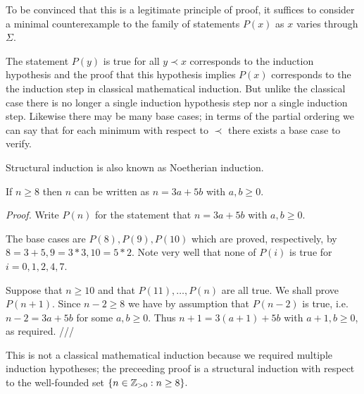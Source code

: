 \begin{ap} To be convinced that this is a legitimate principle of
    proof, it suffices to consider a minimal counterexample to the family of
    statements $P(x)$ as $x$ varies through $\Sigma$.
\end{ap}

\begin{ap} The statement $P(y)$ is true for all $y \prec x$
    corresponds to the induction hypothesis and the proof that this
    hypothesis implies $P(x)$ corresponds to the the induction step in
    classical mathematical induction. But unlike the classical case
    there is no longer a single induction hypothesis step nor a single
    induction step. Likewise there may be many base cases; in terms of
    the partial ordering we can say that for each minimum with respect
    to $\prec$ there exists a base case to verify.
\end{ap}

\begin{rem} Structural induction is also known as Noetherian
    induction.
\end{rem}

\begin{eg} If $n\ge 8$ then $n$ can be written as $n = 3a+5b$ with
    $a,b \ge 0$.

\noindent \emph{Proof.} Write $P(n)$ for the statement that $n =
3a+5b$ with $a,b \ge 0$.

The base cases are $P(8), P(9), P(10)$ which are proved, respectively,
by $8=3+5, 9 = 3*3, 10 = 5*2$. Note very well that none of $P(i)$ is
true for $i=0,1,2,4,7$.

Suppose that $n\ge 10$ and that $P(11),\dots,P(n)$ are all true. We
shall prove $P(n+1)$. Since $n-2 \ge 8$ we have by assumption that
$P(n-2)$ is true, i.e.~$n-2=3a+5b$ for some $a,b \ge 0$. Thus $n+1 =
3(a+1)+5b$ with $a+1, b \ge 0$, as required. ///

This is not a classical mathematical induction because we required
multiple induction hypotheses; the preceeding proof is a structural
induction with respect to the well-founded set $\{n \in \mathbb{Z}_{>0} : n
\ge 8\}.$
\end{eg}

